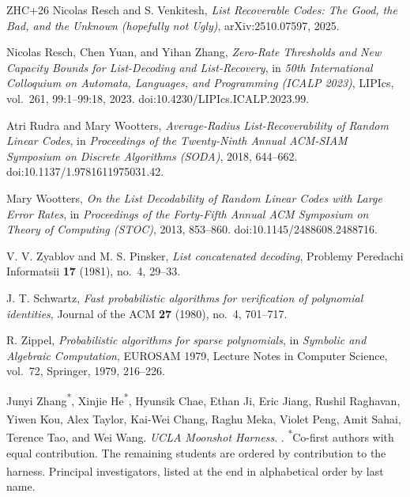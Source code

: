 \documentclass{amsart}
\theoremstyle{definition}
\theoremstyle{remark}
\begin{document}
\begin{thebibliography}{ZHC+26}
Nicolas Resch and S. Venkitesh,
\emph{List Recoverable Codes: The Good, the Bad, and the Unknown (hopefully not Ugly)},
arXiv:2510.07597, 2025.

Nicolas Resch, Chen Yuan, and Yihan Zhang,
\emph{Zero-Rate Thresholds and New Capacity Bounds for List-Decoding and List-Recovery},
in \emph{50th International Colloquium on Automata, Languages, and Programming (ICALP 2023)},
LIPIcs, vol.~261, 99:1--99:18, 2023.
doi:10.4230/LIPIcs.ICALP.2023.99.

Atri Rudra and Mary Wootters,
\emph{Average-Radius List-Recoverability of Random Linear Codes},
in \emph{Proceedings of the Twenty-Ninth Annual ACM-SIAM Symposium on Discrete Algorithms (SODA)},
2018, 644--662.
doi:10.1137/1.9781611975031.42.

Mary Wootters,
\emph{On the List Decodability of Random Linear Codes with Large Error Rates},
in \emph{Proceedings of the Forty-Fifth Annual ACM Symposium on Theory of Computing (STOC)},
2013, 853--860.
doi:10.1145/2488608.2488716.

V. V. Zyablov and M. S. Pinsker,
\emph{List concatenated decoding},
Problemy Peredachi Informatsii \textbf{17} (1981), no.~4, 29--33.

J. T. Schwartz,
\emph{Fast probabilistic algorithms for verification of polynomial identities},
Journal of the ACM \textbf{27} (1980), no.~4, 701--717.

R. Zippel,
\emph{Probabilistic algorithms for sparse polynomials},
in \emph{Symbolic and Algebraic Computation}, EUROSAM 1979,
Lecture Notes in Computer Science, vol.~72, Springer, 1979, 216--226.

Junyi Zhang\textsuperscript{*}, Xinjie He\textsuperscript{*}, Hyunsik Chae,
Ethan Ji, Eric Jiang, Rushil Raghavan, Yiwen Kou, Alex Taylor,
Kai-Wei Chang\textsuperscript{\textdagger}, Raghu Meka\textsuperscript{\textdagger},
Violet Peng\textsuperscript{\textdagger}, Amit Sahai\textsuperscript{\textdagger},
Terence Tao\textsuperscript{\textdagger}, and Wei Wang\textsuperscript{\textdagger}.
\newblock \emph{UCLA Moonshot Harness}.
.
\newblock \textsuperscript{*}Co-first authors with equal contribution.
The remaining students are ordered by contribution to the harness.
\textsuperscript{\textdagger}Principal investigators, listed at the end in
alphabetical order by last name.

\end{thebibliography}
\end{document}
